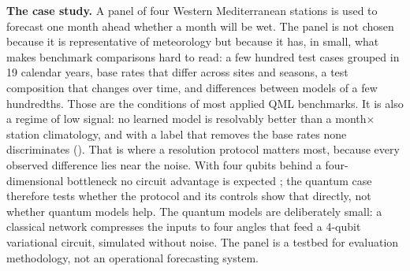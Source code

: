 \documentclass[11pt,a4paper]{article}
\begin{document}
\textbf{The case study.} A panel of four Western Mediterranean stations is used to forecast one month ahead whether a month will be wet. The panel is not chosen because it is representative of meteorology but because it has, in small, what makes benchmark comparisons hard to read: a few hundred test cases grouped in 19 calendar years, base rates that differ across sites and seasons, a test composition that changes over time, and differences between models of a few hundredths. Those are the conditions of most applied QML benchmarks. It is also a regime of low signal: no learned model is resolvably better than a month$\times$station climatology, and with a label that removes the base rates none discriminates (). That is where a resolution protocol matters most, because every observed difference lies near the noise. With four qubits behind a four-dimensional bottleneck no circuit advantage is expected \citep{schuld2021fourier,schreiber2023}; the quantum case therefore tests whether the protocol and its controls show that directly, not whether quantum models help. The quantum models are deliberately small: a classical network compresses the inputs to four angles that feed a 4-qubit variational circuit, simulated without noise. The panel is a testbed for evaluation methodology, not an operational forecasting system.
\end{document}
